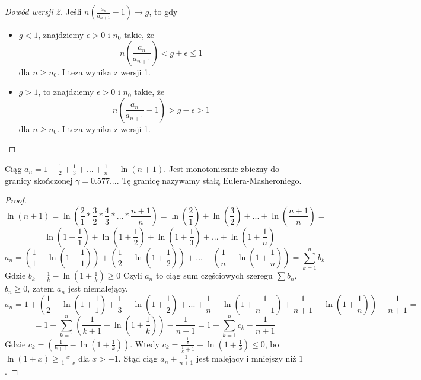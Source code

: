 \documentclass[9pt]{article}
\begin{document}
\begin{proof}[Dowód wersji 2]
    Jeśli $n \left(\frac{a_n}{a_{n+1}} - 1\right) \to g$, to gdy
    \begin{itemize}
        \item $g < 1$, znajdziemy $\epsilon > 0$ i $n_0$ takie, że
            \[
                n \left(\frac{a_n}{a_{n+1}}\right) < g+\epsilon \le 1
            \]
            dla $n \ge n_0$. I teza wynika z wersji 1.
        \item $g > 1$, to znajdziemy $\epsilon > 0$ i $n_0$ takie, że
            \[
                n \left(\frac{a_n}{a_{n+1}} - 1\right) > g-\epsilon > 1
            \]
            dla $n \ge n_0$. I teza wynika z wersji 1.
    \end{itemize}
\end{proof}

\begin{Twi}
    Ciąg $a_n = 1 + \frac{1}{2} + \frac{1}{3} + ... + \frac{1}{n} - \ln (n+1)$. Jest monotonicznie
    zbieżny do granicy skończonej $\gamma = 0.577...$. Tę granicę nazywamy stałą
    Eulera-Masheroniego.
\end{Twi}

\begin{proof}
    \[
        \ln(n+1) = \ln \left( \frac{2}{1} * \frac{3}{2} * \frac{4}{3} * ... * \frac{n+1}{n}\right)
        =
        \ln \left(\frac{2}{1}\right) + \ln \left(\frac{3}{2}\right) + ... + \ln \left(\frac{n+1}{n}\right)
        =
    \]
    \[
        =
        \ln \left(1+ \frac{1}{1}\right) + 
        \ln \left(1+ \frac{1}{2}\right) + 
        \ln \left(1+ \frac{1}{3}\right) + ... +
        \ln \left(1+ \frac{1}{n}\right)
    \]
    \[
        a_n =
        \left(\frac{1}{1} - \ln\left(1 + \frac{1}{1}\right)\right) +
        \left(\frac{1}{2} - \ln\left(1 + \frac{1}{2}\right)\right) + ... +
        \left(\frac{1}{n} - \ln\left(1 + \frac{1}{n}\right)\right)
        =
        \sum_{k = 1}^n b_k
    \]
    Gdzie $b_k = \frac{1}{k} - \ln (1 + \frac{1}{k}) \ge 0$ Czyli $a_n$ to ciąg sum częściowych
    szeregu $\sum b_n$, $b_n \ge 0$, zatem $a_n$ jest niemalejący.
    \[
        a_n = 1 + \left(
        \frac{1}{2} - \ln \left(1 + \frac{1}{1}\right) +
        \frac{1}{3} - \ln \left(1 + \frac{1}{2}\right) + ... +
        \frac{1}{n} - \ln \left(1 + \frac{1}{n-1}\right) +
        \frac{1}{n+1} - \ln \left(1 + \frac{1}{n}\right)
        \right) - \frac{1}{n+1}
        =
    \]
    \[
        =
        1 + \sum_{k = 1}^n \left(\frac{1}{k+1} - \ln \left(1+ \frac{1}{k}\right)\right) - \frac{1}{n+1}
        =
        1 + \sum_{k = 1}^n c_k - \frac{1}{n+1}
    \]
    Gdzie $c_k = \left(\frac{1}{k+1} - \ln \left(1+ \frac{1}{k}\right)\right)$. Wtedy
    $c_k = \frac{\frac{1}{k}}{ \frac{1}{k}+1} - \ln \left(1+ \frac{1}{k}\right) \le 0$, bo
    $\ln (1+x) \ge \frac{x}{1+x}$ dla $x >-1$. Stąd ciąg $a_n + \frac{1}{n+1}$ jest malejący i
    mniejszy niż $1$.
\end{proof}
\end{document}
